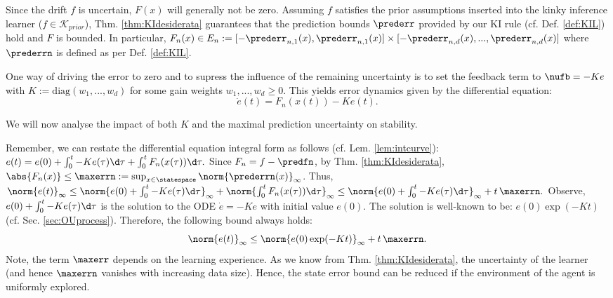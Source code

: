 Since the drift $f$ is uncertain, $F(x)$ will generally not be zero. Assuming $f$ satisfies the prior assumptions inserted into the kinky inference learner ($f \in \mathcal K_{prior}$), Thm. \ref{thm:KIdesiderata} guarantees that the prediction bounds $\prederr$ provided by our KI rule (cf. Def. \ref{def:KIL}) hold and $F$ is bounded. In particular, $F_n(x) \in E_n := [-\prederr_{n,1}(x), \prederr_{n,1}(x)] \times [-\prederr_{n,d}(x),...,\prederr_{n,d}(x)]$ where $\prederrn$ is defined as per Def. \ref{def:KIL}.
 
One way of driving the error to zero and to supress the influence of the remaining uncertainty is to set the feedback term to $\nufb = -K e$ with $K := \text{diag}(w_1,...,w_d)$ for some gain weights $w_1,...,w_d \geq 0$.
%
This yields error dynamics given by the differential equation:
 \begin{equation}
	\dot e (t) = F_n(x(t)) - K e(t).
\end{equation}


We will now analyse the impact of both $K$ and the maximal prediction uncertainty on stability.

Remember, we can restate the differential equation integral form as follows (cf. Lem. \ref{lem:intcurve}):
	$e (t) = e(0) + \int_{0}^t - K e(\tau) \d \tau+ \int_{0}^t F_n(x(\tau)) \d \tau  .$
Since $F_n = f - \predfn$, by Thm. \ref{thm:KIdesiderata}, $\abs{F_n(x)} \leq \maxerrn:= \sup_{x \in \statespace}\norm{\prederrn(x)}_\infty $. Thus, 
$\norm{e (t)}_\infty \leq  \norm{ e(0) + \int_{0}^t - K e(\tau) \d \tau}_{\infty} + \norm{ \int_{0}^t F_n(x(\tau)) \d \tau}_\infty \leq \norm{ e(0) + \int_{0}^t - K e(\tau) \d \tau}_{\infty} +t \, \maxerrn.$ Observe,
 $e(0) + \int_{0}^t - K e(\tau) \d \tau $ is the solution to the ODE $\dot e = - K e$ with initial value $e(0)$. The solution is well-known to be:  $e(0) \exp(-K t)$ (cf. Sec. \ref{sec:OUprocess}). Therefore, the following bound always holds:
%
\begin{equation}\label{eq:errorboundgrowingconttimeKI}
	\norm{e (t)}_\infty \leq \norm{ e(0) \exp(-K t)}_{\infty} +t \, \maxerrn.
\end{equation}
Note, the term $\maxerr$ depends on the learning experience. As we know from Thm. \ref{thm:KIdesiderata}, the uncertainty of the learner (and hence $\maxerrn$ vanishes with increasing data size). Hence, the state  error bound can be reduced if the environment of the agent is uniformly explored.


